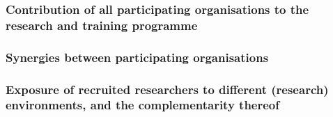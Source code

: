 \subsubsection{Contribution of all participating organisations to the research and training programme}


\subsubsection{Synergies between participating organisations}

\subsubsection{Exposure of recruited researchers to different (research)
  environments, and the complementarity thereof}

